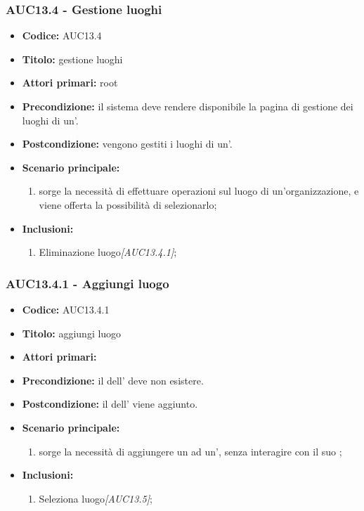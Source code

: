 \documentclass[casi-duso]{subfiles}
\begin{document}
\subsubsection{AUC13.4 - Gestione luoghi}
\label{subsub:AUC13.4}
\begin{itemize}
  \item \textbf{Codice:} AUC13.4
  \item \textbf{Titolo:} gestione luoghi
  \item \textbf{Attori primari:} root
  \item \textbf{Precondizione:} il sistema deve rendere disponibile la pagina di gestione dei luoghi di un'.
  \item \textbf{Postcondizione:} vengono gestiti i luoghi di un'.
  \item \textbf{Scenario principale:}
  \begin{enumerate}
    \item sorge la necessità di effettuare operazioni sul luogo di un'organizzazione, e viene offerta la possibilità di selezionarlo;
  \end{enumerate}
  \item \textbf{Inclusioni:}
  \begin{enumerate}
    \item Eliminazione luogo\emph{[AUC13.4.1]};
  \end{enumerate}
\end{itemize}

\subsubsection{AUC13.4.1 - Aggiungi luogo}
\label{subsub:AUC13.4.1}
\begin{itemize}
  \item \textbf{Codice:} AUC13.4.1
  \item \textbf{Titolo:} aggiungi luogo
  \item \textbf{Attori primari:} 
  \item \textbf{Precondizione:} il  dell' deve non esistere.
  \item \textbf{Postcondizione:} il  dell' viene aggiunto.
  \item \textbf{Scenario principale:}
  \begin{enumerate}
    \item sorge la necessità di aggiungere un  ad un', senza interagire con il suo ;
  \end{enumerate}
  \item \textbf{Inclusioni:}
  \begin{enumerate}
    \item Seleziona luogo\emph{[AUC13.5]};
  \end{enumerate}
\end{itemize}
\end{document}

